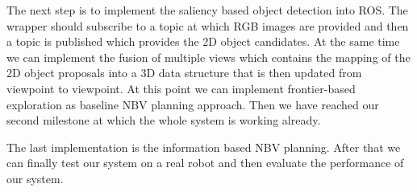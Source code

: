 \documentclass[a4paper,11pt,english]{article}
\begin{document}
The next step is to implement the saliency based object detection into ROS. The wrapper should subscribe to a topic at which RGB images are provided and then a topic is published which provides the 2D object candidates.
At the same time we can implement the fusion of multiple views which contains the mapping of the 2D object proposals into a 3D data structure that is then updated from viewpoint to viewpoint.
At this point we can implement frontier-based exploration as baseline NBV planning approach.
Then we have reached our second milestone at which the whole system is working already.

The last implementation is the information based NBV planning.
After that we can finally test our system on a real robot and then evaluate the performance of our system. 


\newpage


\end{document}
